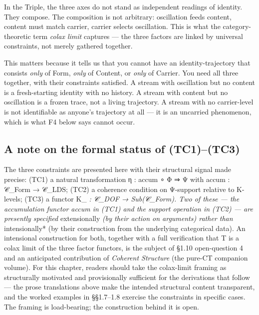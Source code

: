 \documentclass[11pt, openany]{book}
\newcommand{\sectionbreak}{\clearpage}
\begin{document}
In the Triple, the three axes do not stand as independent readings of identity. They compose. The composition is not arbitrary: oscillation feeds content, content must match carrier, carrier selects oscillation. This is what the category-theoretic term \textit{colax limit} captures --- the three factors are linked by universal constraints, not merely gathered together.

This matters because it tells us that you cannot have an identity-trajectory that consists \textit{only} of Form, \textit{only} of Content, or \textit{only} of Carrier. You need all three together, with their constraints satisfied. A stream with oscillation but no content is a fresh-starting identity with no history. A stream with content but no oscillation is a frozen trace, not a living trajectory. A stream with no carrier-level is not identifiable as anyone's trajectory at all --- it is an uncarried phenomenon, which is what F4 below says cannot occur.

\subsection{A note on the formal status of (TC1)–(TC3)}

The three constraints are presented here with their structural signal made precise: (TC1) a natural transformation η : accum ∘ Φ ⇒ Ψ with accum : 𝒞\_\allowbreak{}Form → 𝒞\_\allowbreak{}LDS; (TC2) a coherence condition on Ψ-support relative to Κ-levels; (TC3) a functor Κ\_\allowbreak{}\textit{ : 𝒞\_\allowbreak{}DOF → Sub(𝒞\_\allowbreak{}Form). Two of these --- the accumulation functor accum in (TC1) and the support operation in (TC2) --- are presently specified }extensionally\textit{ (by their action on arguments) rather than }intensionally* (by their construction from the underlying categorical data). An intensional construction for both, together with a full verification that T is a colax limit of the three factor functors, is the subject of §1.10 open-question 4 and an anticipated contribution of \textit{Coherent Structure} (the pure-CT companion volume). For this chapter, readers should take the colax-limit framing as structurally motivated and provisionally sufficient for the derivations that follow --- the prose translations above make the intended structural content transparent, and the worked examples in §§1.7–1.8 exercise the constraints in specific cases. The framing is load-bearing; the construction behind it is open.

\sectionbreak
\end{document}
